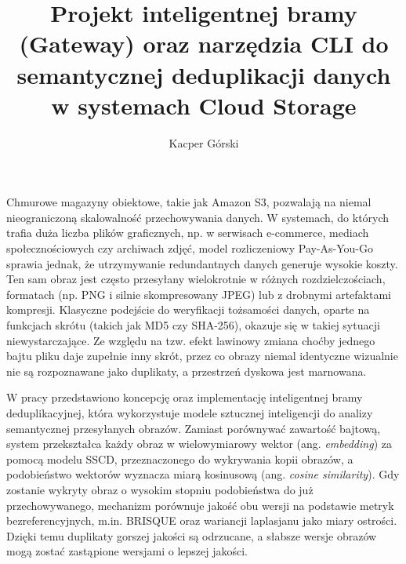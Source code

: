\documentclass[
    bindingoffset=5mm,  %
    footnoteindent=3mm, %
    hyphenation=true    %
]{src/wut-thesis}
\begin{document}
\title{
    Projekt inteligentnej bramy (Gateway) oraz narzędzia CLI do \\ semantycznej deduplikacji danych w systemach Cloud Storage
}

\author{Kacper Górski}
\date{\the\year}
\maketitle

\cleardoublepage %
\abstract
Chmurowe magazyny obiektowe, takie jak Amazon S3, pozwalają na niemal nieograniczoną skalowalność przechowywania danych. W systemach, do których trafia duża liczba plików graficznych, np. w serwisach e-commerce, mediach społecznościowych czy archiwach zdjęć, model rozliczeniowy Pay-As-You-Go sprawia jednak, że utrzymywanie redundantnych danych generuje wysokie koszty. Ten sam obraz jest często przesyłany wielokrotnie w różnych rozdzielczościach, formatach (np. PNG i silnie skompresowany JPEG) lub z drobnymi artefaktami kompresji. Klasyczne podejście do weryfikacji tożsamości danych, oparte na funkcjach skrótu (takich jak MD5 czy SHA-256), okazuje się w takiej sytuacji niewystarczające. Ze względu na tzw. efekt lawinowy zmiana choćby jednego bajtu pliku daje zupełnie inny skrót, przez co obrazy niemal identyczne wizualnie nie są rozpoznawane jako duplikaty, a przestrzeń dyskowa jest marnowana.

W pracy przedstawiono koncepcję oraz implementację inteligentnej bramy deduplikacyjnej, która wykorzystuje modele sztucznej inteligencji do analizy semantycznej przesyłanych obrazów. Zamiast porównywać zawartość bajtową, system przekształca każdy obraz w wielowymiarowy wektor (ang. \emph{embedding}) za pomocą modelu SSCD, przeznaczonego do wykrywania kopii obrazów, a podobieństwo wektorów wyznacza miarą kosinusową (ang. \emph{cosine similarity}). Gdy zostanie wykryty obraz o wysokim stopniu podobieństwa do już przechowywanego, mechanizm porównuje jakość obu wersji na podstawie metryk bezreferencyjnych, m.in. BRISQUE oraz wariancji laplasjanu jako miary ostrości. Dzięki temu duplikaty gorszej jakości są odrzucane, a słabsze wersje obrazów mogą zostać zastąpione wersjami o lepszej jakości.
\end{document}
